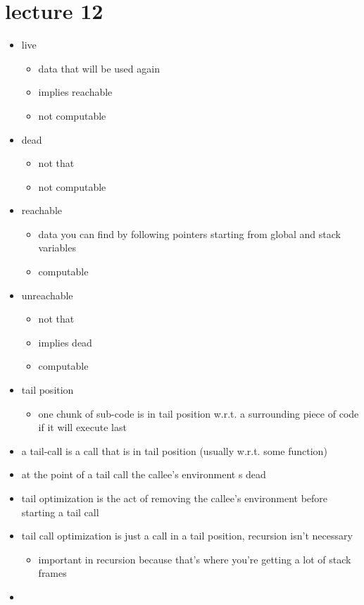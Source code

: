 \documentclass[11pt]{article}
\begin{document}
\section{lecture 12}
\label{sec-11}
\begin{itemize}
\item live
\begin{itemize}
\item data that will be used again
\item implies reachable
\item not computable
\end{itemize}
\item dead
\begin{itemize}
\item not that
\item not computable
\end{itemize}
\item reachable
\begin{itemize}
\item data you can find by following pointers starting from global and stack variables
\item computable
\end{itemize}
\item unreachable
\begin{itemize}
\item not that
\item implies dead
\item computable
\end{itemize}
\item tail position
\begin{itemize}
\item one chunk of sub-code is in tail position w.r.t. a surrounding piece of code if it will execute last
\end{itemize}
\item a tail-call is a call that is in tail position (usually w.r.t. some function)
\item at the point of a tail call the callee's environment s dead
\item tail optimization is the act of removing the callee's environment before starting a tail call
\item tail call optimization is just a call in a tail position, recursion isn't necessary
\begin{itemize}
\item important in recursion because that's where you're getting a lot of stack frames
\end{itemize}
\item 
\end{itemize}
\end{document}
